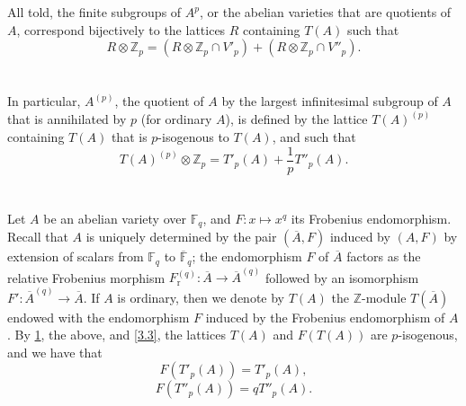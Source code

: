 \documentclass{article}
\newcommand{\FF}{\mathbb{F}}
\newcommand{\ZZ}{\mathbb{Z}}
\newcommand{\Fr}{F_\mathrm{r}}
\begin{document}
All told, the finite subgroups of $A^p$, or the abelian varieties that are quotients of $A$, correspond bijectively to the lattices $R$ containing $T(A)$ such that
\[
\label{4.1}
  R\otimes\ZZ_p = (R\otimes\ZZ_p \cap V'_p) + (R\otimes\ZZ_p \cap V''_p).
\tag{4.1}
\]


\section{}
\label{5}
In particular, $A^{(p)}$, the quotient of $A$ by the largest infinitesimal subgroup of $A$ that is annihilated by $p$ (for ordinary $A$), is defined by the lattice $T(A)^{(p)}$ containing $T(A)$ that is $p$-isogenous to $T(A)$, and such that
\[
  T(A)^{(p)}\otimes\ZZ_p = T'_p(A) + \frac1p T''_p(A).
\]


\section{}
\label{6}
Let $A$ be an abelian variety over $\FF_q$, and $F\colon x\mapsto x^q$ its Frobenius endomorphism.
Recall that $A$ is uniquely determined by the pair $(\overline{A},F)$ induced by $(A,F)$ by extension of scalars from $\FF_q$ to $\overline{\FF}_q$;
the endomorphism $F$ of $\overline{A}$ factors as the relative Frobenius morphism $\Fr^{(q)}\colon\overline{A}\to\overline{A}^{(q)}$ followed by an isomorphism $F'\colon\overline{A}^{(q)}\to\overline{A}$.
If $A$ is ordinary, then we denote by $T(A)$ the $\ZZ$-module $T(\overline{A})$ endowed with the endomorphism $F$ induced by the Frobenius endomorphism of $A$.
By \cref{5}, the above, and \cref{3.3}, the lattices $T(A)$ and $F(T(A))$ are $p$-isogenous, and we have that
\[
\label{6.1}
  F(T'_p(A)) = T'_p(A),
\tag{6.1}
\]
\[
\label{6.2}
  F(T''_p(A)) = qT''_p(A).
\tag{6.2}
\]
\end{document}
